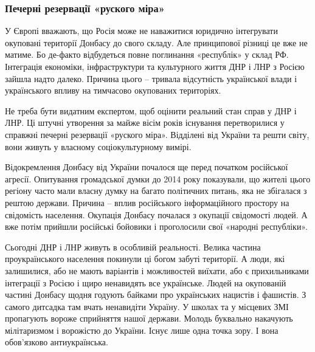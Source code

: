  
 
 
 
 

\subsubsection{Печерні резервації «руского міра»}

У Європі вважають, що Росія може не наважитися юридично інтегрувати окуповані
території Донбасу до свого складу. Але принципової різниці це вже не матиме. Бо
де-факто відбудеться повне поглинання «республік» у склад РФ. Інтеграція
економіки, інфраструктури та культурного життя ДНР і ЛНР з Росією зайшла надто
далеко. Причина цього – тривала відсутність української влади і українського
впливу на тимчасово окупованих територіях.

Не треба бути видатним експертом, щоб оцінити реальний стан справ у ДНР і ЛНР.
Ці штучні утворення за майже вісім років існування перетворилися у справжні
печерні резервації «руского міра». Відділені від України та решти світу, вони
живуть у власному соціокультурному вимірі.

Відокремлення Донбасу від України почалося ще перед початком російської
агресії. Опитування громадської думки до 2014 року показували, що жителі цього
регіону часто мали власну думку на багато політичних питань, яка не збігалася з
рештою держави. Причина – вплив російського інформаційного простору на
свідомість населення. Окупація Донбасу почалася з окупації свідомості людей. А
вже потім прийшли російські бойовики і проголосили свої «народні республіки».

Сьогодні ДНР і ЛНР живуть в особливій реальності. Велика частина
проукраїнського населення покинули ці богом забуті території. А люди, які
залишилися, або не мають варіантів і можливостей виїхати, або є прихильниками
інтеграції з Росією і щиро ненавидять все українське. Людей на окупованій
частині Донбасу щодня годують байками про українських нацистів і фашистів. З
самого дитсадка там вчать ненавидіти Україну. У школах та у місцевих ЗМІ
пропагують вороже сприйняття нашої держави. Молодь буквально накачують
мілітаризмом і ворожістю до України. Існує лише одна точка зору. І вона
обов’язково антиукраїнська.

